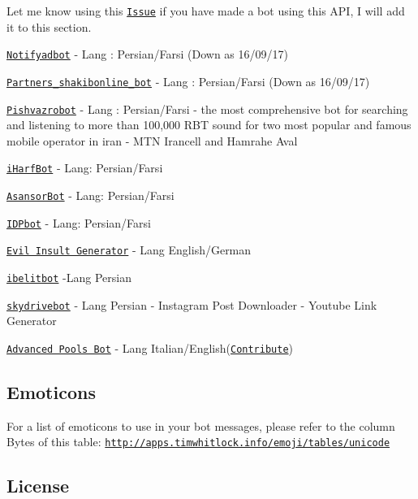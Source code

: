 Let me know using this \href{https://github.com/Eleirbag89/TelegramBotPHP/issues/80}{\tt Issue} if you have made a bot using this A\-P\-I, I will add it to this section.
\begin{DoxyItemize}
\item \href{https://telegram.me/notifyadbot}{\tt Notifyadbot} -\/ Lang \-: Persian/\-Farsi (Down as 16/09/17)
\item \href{https://telegram.me/Partners_shakibonline_bot}{\tt Partners\-\_\-shakibonline\-\_\-bot} -\/ Lang \-: Persian/\-Farsi (Down as 16/09/17)
\item \href{https://t.me/pishvazrobot}{\tt Pishvazrobot} -\/ Lang \-: Persian/\-Farsi -\/ the most comprehensive bot for searching and listening to more than 100,000 R\-B\-T sound for two most popular and famous mobile operator in iran -\/ M\-T\-N Irancell and Hamrahe Aval
\item \href{https://t.me/iHarfBot}{\tt i\-Harf\-Bot} -\/ Lang\-: Persian/\-Farsi
\item \href{https://t.me/AsansorBot}{\tt Asansor\-Bot} -\/ Lang\-: Persian/\-Farsi
\item \href{https://t.me/IDPbot}{\tt I\-D\-Pbot} -\/ Lang\-: Persian/\-Farsi
\item \href{https://telegram.me/EvilInsultGeneratorBot}{\tt Evil Insult Generator} -\/ Lang English/\-German
\item \href{https://telegram.me/ibelitbot}{\tt ibelitbot} -\/\-Lang Persian
\item \href{https://telegram.me/skydrivebot}{\tt skydrivebot} -\/ Lang Persian -\/ Instagram Post Downloader -\/ Youtube Link Generator
\item \href{https://telegram.me/apollbot}{\tt Advanced Pools Bot} -\/ Lang Italian/\-English(\href{https://poeditor.com/join/project/NMAUjrAZ5f}{\tt Contribute})
\end{DoxyItemize}

\subsection*{Emoticons }

For a list of emoticons to use in your bot messages, please refer to the column Bytes of this table\-: \href{http://apps.timwhitlock.info/emoji/tables/unicode}{\tt http\-://apps.\-timwhitlock.\-info/emoji/tables/unicode}

\subsection*{License }

